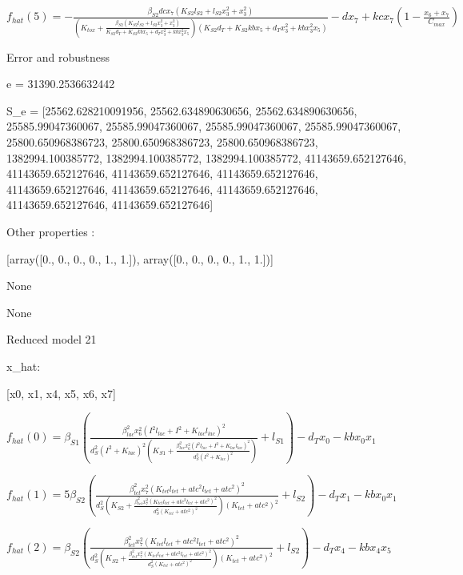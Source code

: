 $f_{hat}(5)=- \frac{\beta_{S2} dc x_{7} \left(K_{S2} l_{S2} + l_{S2} x_{3}^{2} + x_{3}^{2}\right)}{\left(K_{tox} + \frac{\beta_{S2} \left(K_{S2} l_{S2} + l_{S2} x_{3}^{2} + x_{3}^{2}\right)}{K_{S2} d_{T} + K_{S2} kb x_{5} + d_{T} x_{3}^{2} + kb x_{3}^{2} x_{5}}\right) \left(K_{S2} d_{T} + K_{S2} kb x_{5} + d_{T} x_{3}^{2} + kb x_{3}^{2} x_{5}\right)} - d x_{7} + kc x_{7} \left(1 - \frac{x_{6} + x_{7}}{C_{max}}\right)$



Error and robustness 


e = 31390.2536632442

S_e = [25562.628210091956, 25562.634890630656, 25562.634890630656, 25585.99047360067, 25585.99047360067, 25585.99047360067, 25585.99047360067, 25800.650968386723, 25800.650968386723, 25800.650968386723, 1382994.100385772, 1382994.100385772, 1382994.100385772, 41143659.652127646, 41143659.652127646, 41143659.652127646, 41143659.652127646, 41143659.652127646, 41143659.652127646, 41143659.652127646, 41143659.652127646, 41143659.652127646]

Other properties :


[array([0., 0., 0., 0., 1., 1.]), array([0., 0., 0., 0., 1., 1.])]

None

None

Reduced model 21

x_{hat}: 

[x0, x1, x4, x5, x6, x7]


$f_{hat}(0)=\beta_{S1} \left(\frac{\beta_{lac}^{2} x_{6}^{2} \left(I^{2} l_{lac} + I^{2} + K_{lac} l_{lac}\right)^{2}}{d_{S}^{2} \left(I^{2} + K_{lac}\right)^{2} \left(K_{S1} + \frac{\beta_{lac}^{2} x_{6}^{2} \left(I^{2} l_{lac} + I^{2} + K_{lac} l_{lac}\right)^{2}}{d_{S}^{2} \left(I^{2} + K_{lac}\right)^{2}}\right)} + l_{S1}\right) - d_{T} x_{0} - kb x_{0} x_{1}$


$f_{hat}(1)=5 \beta_{S2} \left(\frac{\beta_{tet}^{2} x_{7}^{2} \left(K_{tet} l_{tet} + atc^{2} l_{tet} + atc^{2}\right)^{2}}{d_{S}^{2} \left(K_{S2} + \frac{\beta_{tet}^{2} x_{7}^{2} \left(K_{tet} l_{tet} + atc^{2} l_{tet} + atc^{2}\right)^{2}}{d_{S}^{2} \left(K_{tet} + atc^{2}\right)^{2}}\right) \left(K_{tet} + atc^{2}\right)^{2}} + l_{S2}\right) - d_{T} x_{1} - kb x_{0} x_{1}$


$f_{hat}(2)=\beta_{S2} \left(\frac{\beta_{tet}^{2} x_{7}^{2} \left(K_{tet} l_{tet} + atc^{2} l_{tet} + atc^{2}\right)^{2}}{d_{S}^{2} \left(K_{S2} + \frac{\beta_{tet}^{2} x_{7}^{2} \left(K_{tet} l_{tet} + atc^{2} l_{tet} + atc^{2}\right)^{2}}{d_{S}^{2} \left(K_{tet} + atc^{2}\right)^{2}}\right) \left(K_{tet} + atc^{2}\right)^{2}} + l_{S2}\right) - d_{T} x_{4} - kb x_{4} x_{5}$


